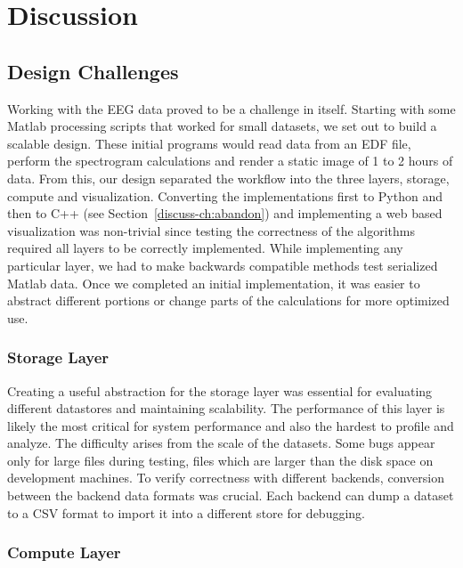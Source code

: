 \chapter{Discussion}\label{discuss-ch}

\section{Design Challenges}

Working with the EEG data proved to be a challenge in itself. Starting with
some Matlab processing scripts that worked for small datasets, we set out to
build a scalable design. These initial programs would read data from an EDF
file, perform the spectrogram calculations and render a static image of 1 to 2
hours of data. From this, our design separated the workflow into the three
layers, storage, compute and visualization. Converting the implementations
first to Python and then to C++ (see Section~\ref{discuss-ch:abandon}) and
implementing a web based visualization was non-trivial since testing the
correctness of the algorithms required all layers to be correctly implemented.
While implementing any particular layer, we had to make backwards compatible
methods test serialized Matlab data. Once we completed an initial
implementation, it was easier to abstract different portions or change parts of
the calculations for more optimized use. \\

\subsection{Storage Layer}

Creating a useful abstraction for the storage layer was essential for
evaluating different datastores and maintaining scalability. The performance of
this layer is likely the most critical for system performance and also the
hardest to profile and analyze. The difficulty arises from the scale of the
datasets. Some bugs appear only for large files during testing, files which are
larger than the disk space on development machines. To verify correctness with
different backends, conversion between the backend data formats was crucial.
Each backend can dump a dataset to a CSV format to import it into a different
store for debugging.

\subsection{Compute Layer}

